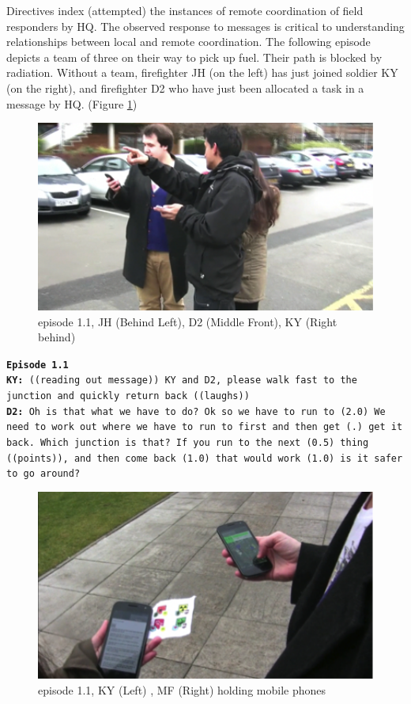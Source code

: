 Directives index (attempted) the instances of remote coordination of field responders by HQ. The observed response to messages is critical to understanding relationships between local and remote coordination. The following episode depicts a team of three on their way to pick up fuel. Their path is blocked by radiation. Without a team, firefighter JH (on the left) has just joined soldier KY (on the right), and firefighter D2 who have just been allocated a task in a message by HQ. (Figure \ref{fig:study1ep11})\\

\begin{figure}[h]
  \centering
  \includegraphics[width=1\textwidth]{img/study1/ep1/ep11}
  \caption{episode 1.1, JH (Behind Left), D2 (Middle Front), KY (Right behind)}
  \label{fig:study1ep11}
\end{figure}


\noindent \texttt{\textbf{Episode 1.1}\\
\textbf{KY:} ((reading out message)) KY and D2, please walk fast to the junction and quickly return back ((laughs))\\
\textbf{D2:} Oh is that what we have to do? Ok so we have to run to (2.0) We need to work out where we have to run to first and then get (.) get it back. Which junction is that? If you run to the next (0.5) thing ((points)), and then come back (1.0) that would work (1.0) is it safer to go around?\\
}


\begin{figure}[h]
  \centering
  \includegraphics[width=1\textwidth]{img/study1/ep1/ep12}
  \caption{episode 1.1, KY (Left) , MF (Right) holding mobile phones}
  \label{fig:study1ep12}
\end{figure}



